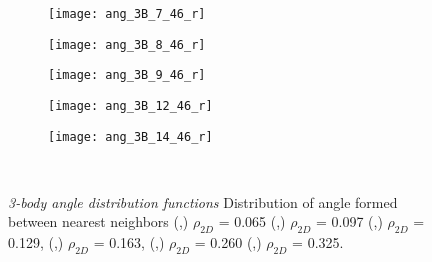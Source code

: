 \documentclass[12pt]{article}
\begin{document}
\begin{figure}[h!]
  \begin{subfigure}[b]{0.15\textwidth}
    \texttt{[image: ang\_3B\_7\_46\_r]}
     \vspace{-15pt} \caption{}
    \label{fig:ang_7_r}
  \end{subfigure}
  \begin{subfigure}[b]{0.15\textwidth}
    \texttt{[image: ang\_3B\_8\_46\_r]}
    \vspace{-15pt} \caption{}
    \label{fig:ang_8_r}
  \end{subfigure}
   \begin{subfigure}[b]{0.15\textwidth}
  \texttt{[image: ang\_3B\_9\_46\_r]}
    \vspace{-15pt} \caption{}
    \label{fig:ang_9_r}
  \end{subfigure}
  \begin{subfigure}[b]{0.15\textwidth}
    \texttt{[image: ang\_3B\_12\_46\_r]}
     \vspace{-15pt} \caption{}
    \label{fig:ang_12_r}
  \end{subfigure}
  \begin{subfigure}[b]{0.15\textwidth}
    \texttt{[image: ang\_3B\_14\_46\_r]}
    \vspace{-15pt} \caption{}
    \label{fig:ang_14_r}
  \end{subfigure}\\
	\caption{\textit{3-body angle distribution functions} Distribution of angle formed between nearest neighbors  (\protect{},\protect{})  \(\rho_{2D}\) = 0.065 (\protect{},\protect{}) \(\rho_{2D}\) = 0.097 (\protect{},\protect{}) \(\rho_{2D}\) = 0.129, (\protect{},\protect{}) \(\rho_{2D}\) = 0.163, (\protect{},\protect{}) \(\rho_{2D}\) = 0.260 (\protect{},\protect{}) \(\rho_{2D}\) = 0.325.}
	\label{fig:3body_angle_dist}
\end{figure}
\end{document}
